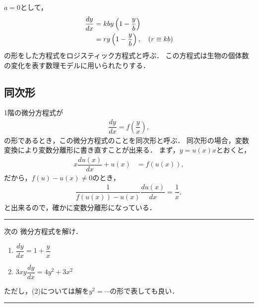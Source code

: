 $a=0$として，
\begin{align}
 \dfrac{dy}{dx} & = kby\left(1-\dfrac{y}{b}\right) \notag \\
                & = r y \left(1-\dfrac{y}{b}\right), \quad (r \equiv kb) 
\end{align}
の形をした方程式をロジスティック方程式と呼ぶ．
この方程式は生物の個体数の変化を表す数理モデルに用いられたりする．

\newpage
%
\subsection{同次形}
%
1階の微分方程式が
\begin{align}
  \dfrac{dy}{dx} = f\left(\dfrac{y}{x}\right),
\end{align}
の形であるとき，この微分方程式のことを同次形と呼ぶ．
同次形の場合，変数変換により変数分離形に書き直すことが出来る．
まず，$y=u\left(x\right)x$とおくと，
\begin{align}
 x\dfrac{du\left(x\right)}{dx}+u\left(x\right) & =f\left(u\left(x\right)\right),
\end{align}
だから，$f\left(u\right) - u\left(x\right) \neq 0$のとき，
\begin{align}
 \dfrac{1}{f\left(u\left(x\right)\right)-u\left(x\right)}\dfrac{du\left(x\right)}{dx}=\dfrac{1}{x},
\end{align}
と出来るので，確かに変数分離形になっている．
%
\newpage
%
\hrule
\reidai
次の
微分方程式を解け．
\begin{enumerate}[(1)]
  \item $\dfrac{dy}{dx} = 1 + \dfrac{y}{x} $
  \item $3xy\dfrac{dy}{dx} = 4y^2 + 3x^2$ 
\end{enumerate}
ただし，(2)については解を$y^2 = \cdots$の形で表しても良い．

\vspace*{.2cm}
\hrule
\vspace*{.2cm}

